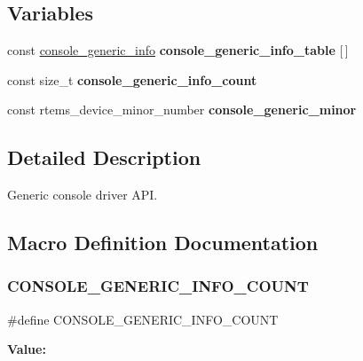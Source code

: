 \subsection*{Variables}
\begin{DoxyCompactItemize}
\item 
\mbox{\label{console-generic_8h_a9309652118a823c109bffd0d29a719d4}} 
const \mbox{\hyperlink{structconsole__generic__info}{console\+\_\+generic\+\_\+info}} {\bfseries console\+\_\+generic\+\_\+info\+\_\+table} \mbox{[}$\,$\mbox{]}
\item 
\mbox{\label{console-generic_8h_a4748dfcca31fc9fc0d5076f3df29b7f5}} 
const size\+\_\+t {\bfseries console\+\_\+generic\+\_\+info\+\_\+count}
\item 
\mbox{\label{console-generic_8h_ab5d53b2f496804b1fb395fd384ce1ba1}} 
const rtems\+\_\+device\+\_\+minor\+\_\+number {\bfseries console\+\_\+generic\+\_\+minor}
\end{DoxyCompactItemize}


\subsection{Detailed Description}
Generic console driver A\+PI. 



\subsection{Macro Definition Documentation}
\mbox{\label{console-generic_8h_af7dddca98557eea3e0c9e659864c707a}} 
\subsubsection{\texorpdfstring{CONSOLE\_GENERIC\_INFO\_COUNT}{CONSOLE\_GENERIC\_INFO\_COUNT}}
{\footnotesize\ttfamily \#define C\+O\+N\+S\+O\+L\+E\+\_\+\+G\+E\+N\+E\+R\+I\+C\+\_\+\+I\+N\+F\+O\+\_\+\+C\+O\+U\+NT}

{\bfseries Value\+:}
\begin{DoxyCode}{0}

\end{DoxyCode}
